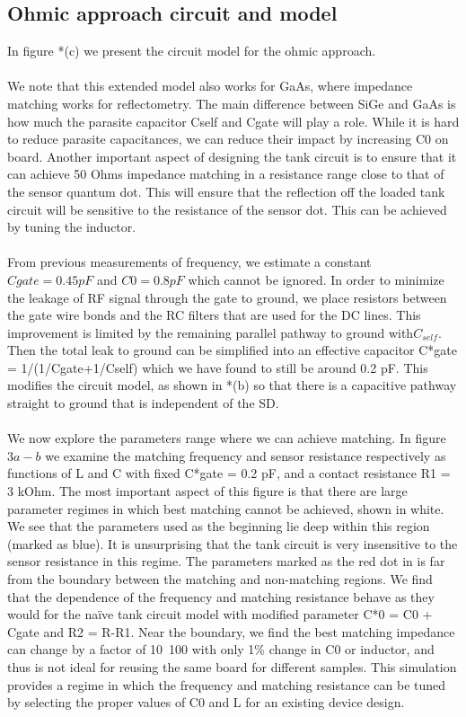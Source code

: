 \documentclass{article}
\begin{document}
\subsection{Ohmic approach circuit and model} %
	\label{sub:ohmic_approach_circuit_and_model}
	In figure *(c) we present the circuit model for the ohmic approach.   
	\\ \\
	We note that this extended model also works for GaAs, where impedance matching works for reflectometry. The main difference between SiGe and GaAs is how much the parasite capacitor Cself and Cgate will play a role. While it is hard to reduce parasite capacitances, we can reduce their impact by increasing C0 on board. Another important aspect of designing the tank circuit is to ensure that it can achieve 50 Ohms impedance matching in a resistance range close to that of the sensor quantum dot.  This will ensure that the reflection off the loaded tank circuit will be sensitive to the resistance of the sensor dot.  This can be achieved by tuning the inductor.  
	\\ \\
	From previous measurements of frequency, we estimate a constant $Cgate = 0.45 pF$ and $C0= 0.8 pF$ which cannot be ignored. In order to minimize the leakage of RF signal through the gate to ground, we place resistors between the gate wire bonds and the RC filters that are used for the DC lines. This improvement is limited by the remaining parallel pathway to ground with$C_{self}$. Then the total leak to ground can be simplified into an effective capacitor C*gate = 1/(1/Cgate+1/Cself) which we have found to still be around 0.2 pF. This modifies the circuit model, as shown in *(b) so that there is a capacitive pathway straight to ground that is independent of the SD.   
	\\ \\
	We now explore the parameters range where we can achieve matching. In figure $3a-b$ we examine the matching frequency and sensor resistance respectively as functions of L and C with fixed C*gate = 0.2 pF, and a contact resistance R1 = 3 kOhm.  The most important aspect of this figure is that there are large parameter regimes in which best matching cannot be achieved, shown in white.  We see that the parameters used as the beginning lie deep within this region (marked as blue). It is unsurprising that the tank circuit is very insensitive to the sensor resistance in this regime. The parameters marked as the red dot in is far from the boundary between the matching and non-matching regions. We find that the dependence of the frequency and matching resistance behave as they would for the naïve tank circuit model with modified parameter C*0 = C0 + Cgate and R2 = R-R1. Near the boundary, we find the best matching impedance can change by a factor of 10~100 with only 1\% change in C0 or inductor, and thus is not ideal for reusing the same board for different samples. This simulation provides a regime in which the frequency and matching resistance can be tuned by selecting the proper values of C0 and L for an existing device design.   
\end{document}
